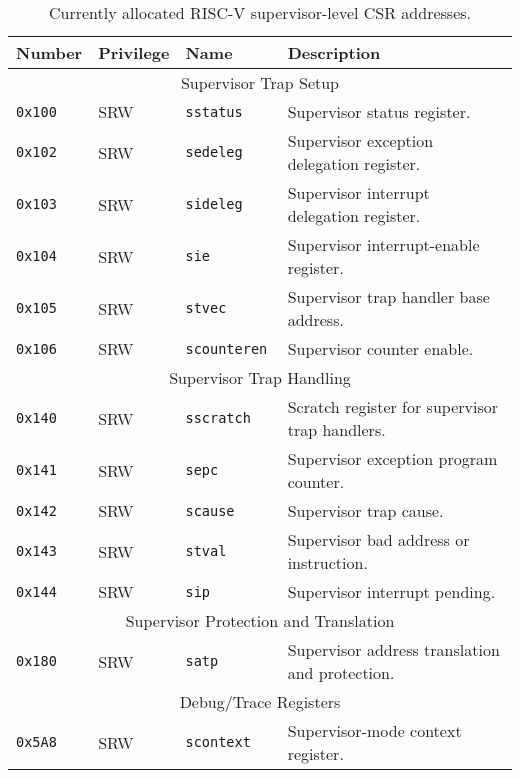 \begin{table}[htb!]
\begin{center}
\begin{tabular}{|l|l|l|l|}
\hline
Number    & Privilege & Name & Description \\
\hline
\multicolumn{4}{|c|}{Supervisor Trap Setup} \\
\hline
\tt 0x100 & SRW  &\tt sstatus    & Supervisor status register. \\
\tt 0x102 & SRW  &\tt sedeleg    & Supervisor exception delegation register. \\
\tt 0x103 & SRW  &\tt sideleg    & Supervisor interrupt delegation register. \\
\tt 0x104 & SRW  &\tt sie        & Supervisor interrupt-enable register. \\
\tt 0x105 & SRW  &\tt stvec      & Supervisor trap handler base address. \\
\tt 0x106 & SRW  &\tt scounteren & Supervisor counter enable. \\
\hline
\multicolumn{4}{|c|}{Supervisor Trap Handling} \\
\hline
\tt 0x140 & SRW  &\tt sscratch   & Scratch register for supervisor trap handlers. \\
\tt 0x141 & SRW  &\tt sepc       & Supervisor exception program counter. \\
\tt 0x142 & SRW  &\tt scause     & Supervisor trap cause. \\
\tt 0x143 & SRW  &\tt stval      & Supervisor bad address or instruction. \\
\tt 0x144 & SRW  &\tt sip        & Supervisor interrupt pending. \\
\hline
\multicolumn{4}{|c|}{Supervisor Protection and Translation} \\
\hline
\tt 0x180 & SRW  &\tt satp       & Supervisor address translation and protection. \\
\hline
\multicolumn{4}{|c|}{Debug/Trace Registers} \\
\hline
\tt 0x5A8 & SRW &\tt scontext & Supervisor-mode context register. \\
\hline
\end{tabular}
\end{center}
\caption{Currently allocated RISC-V supervisor-level CSR addresses.}
\label{scsrnames}
\end{table}

